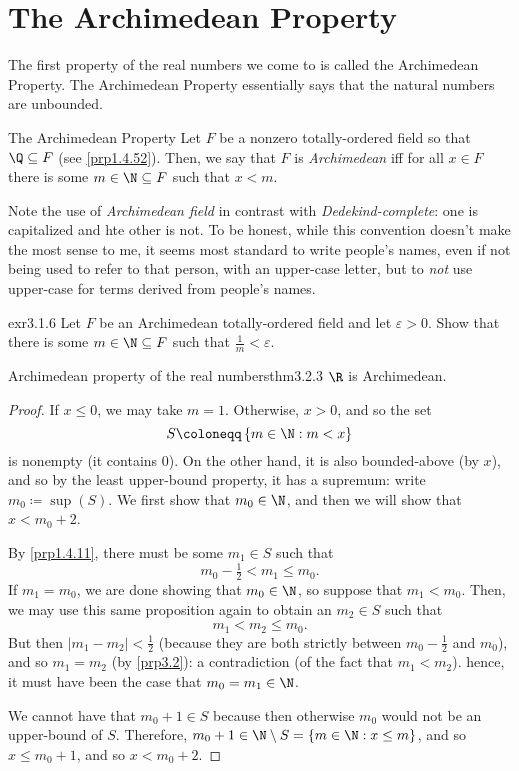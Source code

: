 \section{The Archimedean Property}\label{sct3.2}

The first property of the real numbers we come to is called the Archimedean Property.  The Archimedean Property essentially says that the natural numbers are unbounded.
\begin{dfn}{The Archimedean Property}{}
Let $F$ be a nonzero totally-ordered field so that $\Q \subseteq F$ (see \cref{prp1.4.52}).  Then, we say that $F$ is \emph{Archimedean} iff for all $x\in F$ there is some $m\in \N \subseteq F$ such that $x<m$.
\begin{rmk}
Note the use of \emph{Archimedean field} in contrast with \emph{Dedekind-complete}:  one is capitalized and hte other is not.  To be honest, while this convention doesn't make the most sense to me, it seems most standard to write people's names, even if not being used to refer to that person, with an upper-case letter, but to \emph{not} use upper-case for terms derived from people's names.
\end{rmk}
\end{dfn}
\begin{exr}{}{exr3.1.6}
Let $F$ be an Archimedean totally-ordered field and let $\varepsilon >0$.  Show that there is some $m\in \N \subseteq F$ such that $\frac{1}{m}<\varepsilon$.
\end{exr}
\begin{thm}{Archimedean property of the real numbers}{thm3.2.3}
$\R$ is Archimedean.
\begin{proof}
If $x\leq 0$, we may take $m=1$.  Otherwise, $x>0$, and so the set
\begin{equation}
S\coloneqq \left\{ m\in \N :m<x\right\} 
\end{equation}
is nonempty (it contains $0$).  On the other hand, it is also bounded-above (by $x$), and so by the least upper-bound property, it has a supremum:  write $m_0\coloneqq \sup (S)$.  We first show that $m_0\in \N$, and then we will show that $x<m_0+2$.

By \cref{prp1.4.11}, there must be some $m_1\in S$ such that
\begin{equation}
m_0-\tfrac{1}{2}<m_1\leq m_0.
\end{equation}
If $m_1=m_0$, we are done showing that $m_0\in \N$, so suppose that $m_1<m_0$.  Then, we may use this same proposition again to obtain an $m_2\in S$ such that
\begin{equation}
m_1<m_2\leq m_0.
\end{equation}
But then $|m_1-m_2|<\frac{1}{2}$ (because they are both strictly between $m_0-\frac{1}{2}$ and $m_0$), and so $m_1=m_2$ (by \cref{prp3.2}):  a contradiction (of the fact that $m_1<m_2$).  hence, it must have been the case that $m_0=m_1\in \N$.

We cannot have that $m_0+1\in S$ because then otherwise $m_0$ would not be an upper-bound of $S$.  Therefore, $m_0+1\in \N \setminus S=\left\{ m\in \N :x\leq m\right\}$, and so $x\leq m_0+1$, and so $x<m_0+2$.
\end{proof}
\end{thm}
